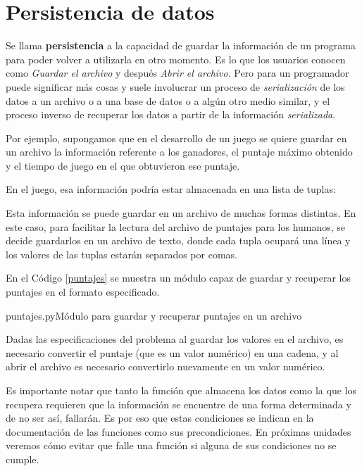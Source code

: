 
\section{Persistencia de datos}

Se llama {\bf persistencia} a la capacidad de guardar la
información de un programa para poder volver a utilizarla en otro
momento. Es lo que los usuarios conocen como {\it Guardar el archivo}
y después {\it Abrir el archivo}. Pero para un programador puede
significar más cosas y suele involucrar un proceso de {\it
serialización} de los datos a un archivo o a una base de datos o a
algún otro medio similar, y el proceso inverso de recuperar los
datos a partir de la información {\it serializada}.


Por ejemplo, supongamos que en el desarrollo de un juego se quiere guardar
en un archivo la información referente a los ganadores, el puntaje máximo
obtenido y el tiempo de juego en el que obtuvieron ese puntaje.

En el juego, esa información podría estar almacenada en una lista de
tuplas:
\begin{codigo-python-sn}
\end{codigo-python-sn}

Esta información se puede guardar en un archivo de muchas formas distintas.
En este caso, para facilitar la lectura del archivo de puntajes para los
humanos, se decide guardarlos en un archivo de texto, donde cada tupla
ocupará una línea y los valores de las tuplas estarán separados por
comas.

En el Código \ref{puntajes} se muestra un módulo capaz de guardar y
recuperar los puntajes en el formato especificado.

\begin{codigo}{puntajes.py}{Módulo para guardar y recuperar puntajes en un archivo}
\label{puntajes}

\end{codigo}

Dadas las especificaciones del problema al guardar los valores en el
archivo, es necesario convertir el puntaje (que es un valor numérico) en
una cadena, y al abrir el archivo es necesario convertirlo nuevamente en un
valor numérico.

\begin{observacion}
Es importante notar que tanto la función que almacena los datos como la que
los recupera requieren que la información se encuentre de una forma
determinada y de no ser así, fallarán.  Es por eso que estas condiciones se
indican en la documentación de las funciones como sus precondiciones. En
próximas unidades veremos cómo evitar que falle una función si alguna de
sus condiciones no se cumple.
\end{observacion}

